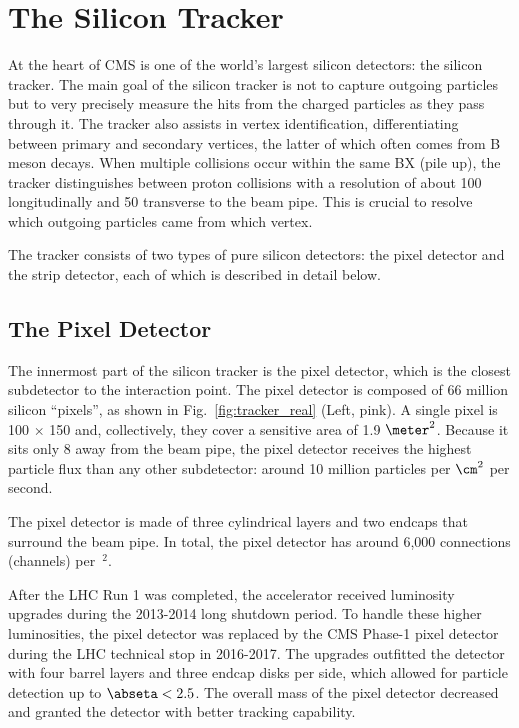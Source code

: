 \section{The Silicon Tracker}
\label{sec:tracker}

At the heart of CMS is one of the world's largest silicon detectors: the silicon tracker.
The main goal of the silicon tracker is not to capture outgoing particles but to very precisely measure the hits from the charged particles as they pass through it.
The tracker also assists in vertex identification, differentiating between primary and secondary vertices, the latter of which often comes from B meson decays.
When multiple \pp collisions occur within the same BX (pile up), the tracker distinguishes between proton collisions with a resolution of about 100 \mum longitudinally and 50 \mum transverse to the beam pipe.
This is crucial to resolve which outgoing particles came from which \pp vertex.

The tracker consists of two types of pure silicon detectors: the pixel detector and the strip detector, each of which is described in detail below.

\subsection{The Pixel Detector}
\label{sec:pixel}

The innermost part of the silicon tracker is the pixel detector, which is the closest subdetector to the interaction point.
The pixel detector is composed of 66 million silicon ``pixels'', as shown in Fig.~\ref{fig:tracker_real} (Left, pink).
A single pixel is 100 \mum $\times$ 150 \mum and, collectively, they cover a sensitive area of 1.9 $\meter^2$.
Because it sits only 8 \cm away from the beam pipe, the pixel detector receives the highest particle flux than any other subdetector:
around 10 million particles per $\cm^2$ per second.

The pixel detector is made of three cylindrical layers and two endcaps that surround the beam pipe.
In total, the pixel detector has around 6,000 connections (channels) per~\cm$^2$.

After the LHC Run 1 was completed, the accelerator received luminosity upgrades during the 2013-2014 long shutdown period.
To handle these higher luminosities, the pixel detector was replaced by the CMS Phase-1 pixel detector during the LHC technical stop in 2016-2017.
The upgrades outfitted the detector with four barrel layers and three endcap disks per side, which allowed for particle detection up to $\abseta < 2.5$.
The overall mass of the pixel detector decreased and granted the detector with better tracking capability.

